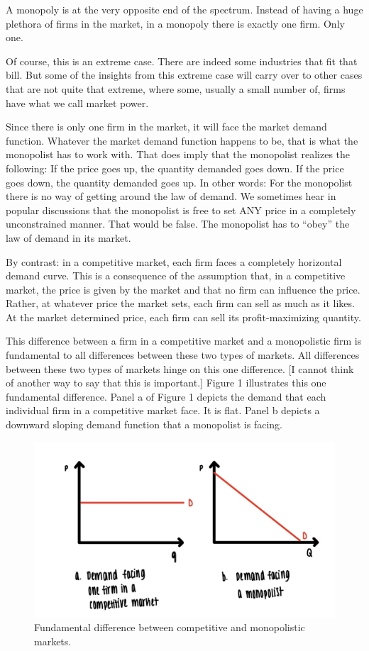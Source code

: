 \documentclass[
]{book}
\begin{document}
A monopoly is at the very opposite end of the spectrum. Instead of having a huge plethora of firms in the market, in a monopoly there is exactly one firm. Only one.

Of course, this is an extreme case. There are indeed some industries that fit that bill. But some of the insights from this extreme case will carry over to other cases that are not quite that extreme, where some, usually a small number of, firms have what we call market power.

Since there is only one firm in the market, it will face the market demand function. Whatever the market demand function happens to be, that is what the monopolist has to work with. That does imply that the monopolist realizes the following: If the price goes up, the quantity demanded goes down. If the price goes down, the quantity demanded goes up. In other words: For the monopolist there is no way of getting around the law of demand. We sometimes hear in popular discussions that the monopolist is free to set ANY price in a completely unconstrained manner. That would be false. The monopolist has to ``obey'' the law of demand in its market.

By contrast: in a competitive market, each firm faces a completely horizontal demand curve. This is a consequence of the assumption that, in a competitive market, the price is given by the market and that no firm can influence the price. Rather, at whatever price the market sets, each firm can sell as much as it likes. At the market determined price, each firm can sell its profit-maximizing quantity.

This difference between a firm in a competitive market and a monopolistic firm is fundamental to all differences between these two types of markets. All differences between these two types of markets hinge on this one difference. {[}I cannot think of another way to say that this is important.{]} Figure 1 illustrates this one fundamental difference. Panel a of Figure 1 depicts the demand that each individual firm in a competitive market face. It is flat. Panel b depicts a downward sloping demand function that a monopolist is facing.

\begin{figure}

{\centering \includegraphics[width=0.75\linewidth]{img/monopoly/fig1} 

}

\caption{Fundamental difference between competitive and monopolistic markets.}\label{fig:monopoly01}
\end{figure}
\end{document}
